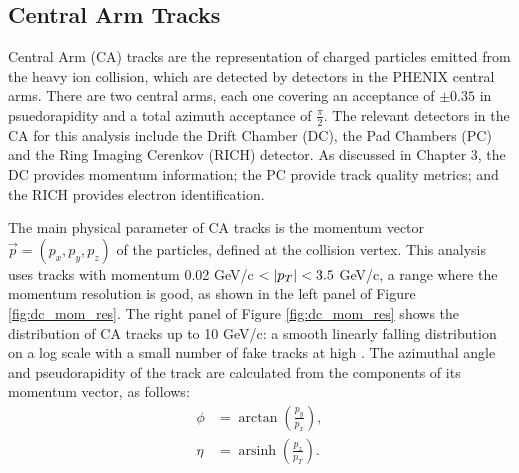 \subsection{Central Arm Tracks}
Central Arm (CA) tracks are the representation of charged particles emitted from the heavy ion collision, which are detected by detectors in the PHENIX central arms. There are two central arms, each one covering an acceptance of $\pm 0.35$ in psuedorapidity and a total azimuth acceptance of $\frac{\pi}{2}$. The relevant detectors in the CA for this analysis include the Drift Chamber (DC), the Pad Chambers (PC) and the Ring Imaging Cerenkov (RICH) detector. As discussed in Chapter 3, the DC provides momentum information; the PC provide track quality metrics; and the RICH provides electron identification. 

The main physical parameter of CA tracks is the momentum vector $\vec{p} = (p_x, p_y, p_z)$ of the particles, defined at the collision vertex. This analysis uses tracks with momentum 0.02 GeV/c $< |\mbox{$p_T$}| < 3.5$ GeV/c, a \pt range where the momentum resolution is good, as shown in the left panel of Figure \ref{fig:dc_mom_res}. The right panel of Figure \ref{fig:dc_mom_res} shows the \pt distribution of CA tracks up to 10 GeV/c: a smooth linearly falling distribution on a log scale with a small number of fake tracks at high \pt. The azimuthal angle and pseudorapidity of the track are calculated from the components of its momentum vector, as follows: 
\begin{align}
\phi &= \arctan( \frac{p_y}{p_x} ),\\
\eta &= \operatorname{arsinh}(\frac{p_z}{p_T}). 
\label{eqn:phi_eta_form}
\end{align}

